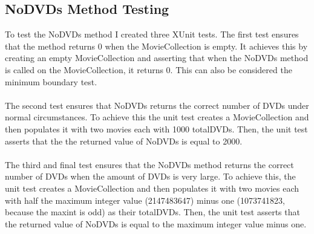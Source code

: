 \documentclass[12pt,a4paper]{article}
\begin{document}
		\subsection{NoDVDs Method Testing}
			To test the NoDVDs method I created three XUnit tests. The first test 
			ensures that the method returns 0 when the MovieCollection is empty. 
			It achieves this by creating an empty MovieCollection and asserting that 
			when the NoDVDs method is called on the MovieCollection, it returns 0. 
			This can also be considered the minimum boundary test.\\ 
			\\
			The second test ensures that NoDVDs returns the correct number of DVDs under 
			normal circumstances. To achieve this the unit test creates a MovieCollection 
			and then populates it with two movies each with 1000 totalDVDs. Then, the 
			unit test asserts that the the returned value of NoDVDs is equal to 2000.\\
			\\
			The third and final test ensures that the NoDVDs method returns the correct 
			number of DVDs when the amount of DVDs is very large. To achieve this, the 
			unit test creates a MovieCollection and then populates it with two movies 
			each with half the maximum integer value (2147483647) minus one (1073741823, 
			because the maxint is odd) as their totalDVDs. Then, the unit test asserts 
			that the returned value of NoDVDs is equal to the maximum integer value 
			minus one.\\ 
\end{document}
